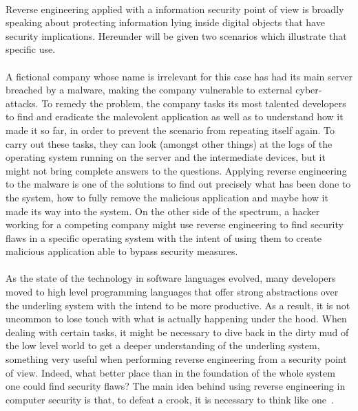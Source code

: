\paragraph{}
Reverse engineering applied with a information security point of view is broadly speaking about protecting information lying inside digital objects that have security implications. Hereunder will be given two scenarios which illustrate that specific use.

\paragraph{}
A fictional company whose name is irrelevant for this case has had its main server breached by a malware, making the company vulnerable to external cyber-attacks. To remedy the problem, the company tasks its most talented developers to find and eradicate the malevolent application as well as to understand how it made it so far, in order to prevent the scenario from repeating itself again. To carry out these tasks, they can look (amongst other things) at the logs of the operating system running on the server and the intermediate devices, but it might not bring complete answers to the questions. Applying reverse engineering to the malware is one of the solutions to find out precisely what has been done to the system, how to fully remove the malicious application and maybe how it made its way into the system. On the other side of the spectrum, a hacker working for a competing company might use reverse engineering to find security flaws in a specific operating system with the intent of using them to create malicious application able to bypass security measures.

\paragraph{}
As the state of the technology in software languages evolved, many developers moved to high level programming languages that offer strong abstractions over the underling system with the intend to be more productive. As a result, it is not uncommon to lose touch with what is actually happening under the hood. When dealing with certain tasks, it might be necessary to dive back in the dirty mud of the low level world to get a deeper understanding of the underling system, something very useful when performing reverse engineering from a security point of view. Indeed, what better place than in the foundation of the whole system one could find security flaws? The main idea behind using reverse engineering in computer security is that, to defeat a crook, it is necessary to think like one~\cite{ali2005teach, cipresso2010software}.

